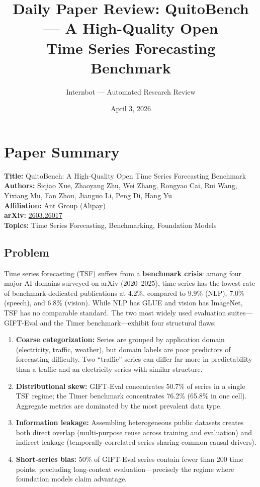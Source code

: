 \documentclass[11pt]{article}
\title{Daily Paper Review: QuitoBench --- A High-Quality Open\\Time Series Forecasting Benchmark}
\author{Internbot --- Automated Research Review}
\date{April 3, 2026}
\begin{document}
\maketitle

\section{Paper Summary}

\textbf{Title:} QuitoBench: A High-Quality Open Time Series Forecasting Benchmark \\
\textbf{Authors:} Siqiao Xue, Zhaoyang Zhu, Wei Zhang, Rongyao Cai, Rui Wang, Yixiang Mu, Fan Zhou, Jianguo Li, Peng Di, Hang Yu \\
\textbf{Affiliation:} Ant Group (Alipay) \\
\textbf{arXiv:} \href{https://arxiv.org/abs/2603.26017}{2603.26017} \\
\textbf{Topics:} Time Series Forecasting, Benchmarking, Foundation Models

\subsection{Problem}

Time series forecasting (TSF) suffers from a \textbf{benchmark crisis}: among four major AI domains surveyed on arXiv (2020--2025), time series has the lowest rate of benchmark-dedicated publications at 4.2\%, compared to 9.9\% (NLP), 7.0\% (speech), and 6.8\% (vision). While NLP has GLUE and vision has ImageNet, TSF has no comparable standard. The two most widely used evaluation suites---GIFT-Eval and the Timer benchmark---exhibit four structural flaws:

\begin{enumerate}
    \item \textbf{Coarse categorization:} Series are grouped by application domain (electricity, traffic, weather), but domain labels are poor predictors of forecasting difficulty. Two ``traffic'' series can differ far more in predictability than a traffic and an electricity series with similar structure.
    \item \textbf{Distributional skew:} GIFT-Eval concentrates 50.7\% of series in a single TSF regime; the Timer benchmark concentrates 76.2\% (65.8\% in one cell). Aggregate metrics are dominated by the most prevalent data type.
    \item \textbf{Information leakage:} Assembling heterogeneous public datasets creates both direct overlap (multi-purpose reuse across training and evaluation) and indirect leakage (temporally correlated series sharing common causal drivers).
    \item \textbf{Short-series bias:} 50\% of GIFT-Eval series contain fewer than 200 time points, precluding long-context evaluation---precisely the regime where foundation models claim advantage.
\end{enumerate}
\end{document}
